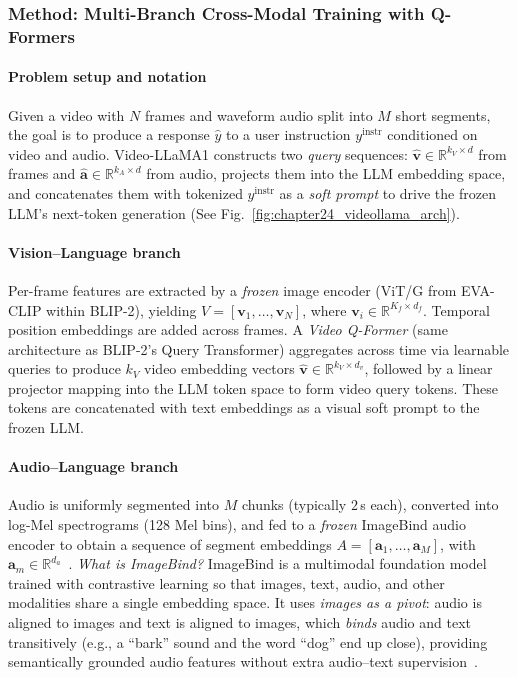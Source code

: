 \begin{enrichment}
\begin{enrichment}
        \subsubsection{Method: Multi-Branch Cross-Modal Training with Q-Formers}
        \label{subsubsec:chapter24_videollama1_method}
        
        \paragraph{Problem setup and notation}
        Given a video with $N$ frames and waveform audio split into $M$ short segments, the goal is to produce a response $\hat{y}$ to a user instruction $y^{\text{instr}}$ conditioned on video and audio. Video-LLaMA1 constructs two \emph{query} sequences: $\hat{\mathbf{v}}\in\mathbb{R}^{k_V\times d}$ from frames and $\hat{\mathbf{a}}\in\mathbb{R}^{k_A\times d}$ from audio, projects them into the LLM embedding space, and concatenates them with tokenized $y^{\text{instr}}$ as a \emph{soft prompt} to drive the frozen LLM’s next-token generation (See Fig.~\ref{fig:chapter24_videollama_arch}).
        
        \paragraph{Vision–Language branch}
        Per-frame features are extracted by a \emph{frozen} image encoder (ViT/G from EVA-CLIP within BLIP-2), yielding $V=[\mathbf{v}_1,\ldots,\mathbf{v}_N]$, where $\mathbf{v}_i\in\mathbb{R}^{K_f\times d_f}$. Temporal position embeddings are added across frames. A \emph{Video Q-Former} (same architecture as BLIP-2’s Query Transformer) aggregates across time via learnable queries to produce $k_V$ video embedding vectors $\hat{\mathbf{v}}\in\mathbb{R}^{k_V\times d_v}$, followed by a linear projector mapping into the LLM token space to form video query tokens. These tokens are concatenated with text embeddings as a visual soft prompt to the frozen LLM.
        
        \paragraph{Audio–Language branch}
        Audio is uniformly segmented into $M$ chunks (typically $2$\,s each), converted into log-Mel spectrograms (128 Mel bins), and fed to a \emph{frozen} ImageBind audio encoder to obtain a sequence of segment embeddings
        $A=[\mathbf{a}_1,\ldots,\mathbf{a}_M]$, with $\mathbf{a}_m\in\mathbb{R}^{d_a}$~\cite{girdhar2023_imagebind}. \textit{What is ImageBind?} ImageBind is a multimodal foundation model trained with contrastive learning so that images, text, audio, and other modalities share a single embedding space. It uses \emph{images as a pivot}: audio is aligned to images and text is aligned to images, which \emph{binds} audio and text transitively (e.g., a “bark” sound and the word “dog” end up close), providing semantically grounded audio features without extra audio–text supervision~\cite{girdhar2023_imagebind}.
        

\end{enrichment}
\end{enrichment}
